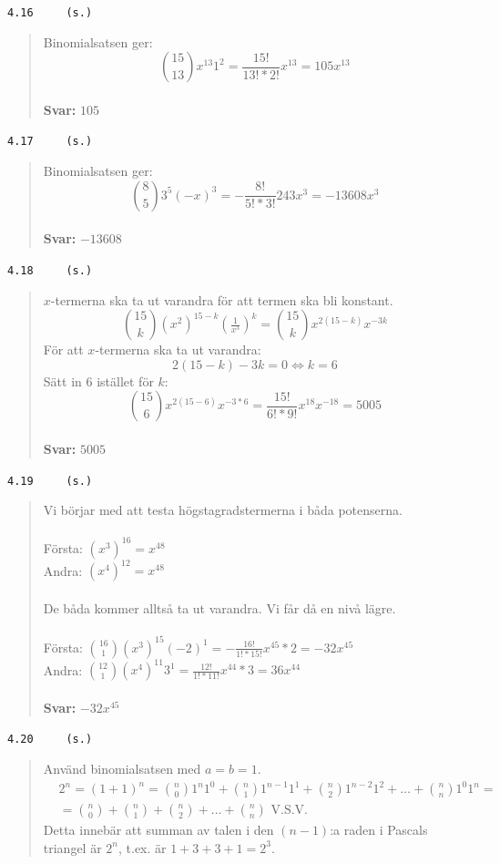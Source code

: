 \documentclass[a4paper]{article}
\newcommand{\tskcol}[1]{\textcolor{tskcol}{#1}}
\begin{document}
	\texttt{\tskcol{4.16~~~~ (s.)}}
	\begin{quotation}
		\noindent
		Binomialsatsen ger:
		\[{15 \choose 13}x^{13}1^2=
		\frac{15!}{13!*2!}x^{13}=
		105x^{13}\]
		\\
		\textbf{Svar:} $105$
	\end{quotation}
	
	\texttt{\tskcol{4.17~~~~ (s.)}}
	\begin{quotation}
		\noindent
		Binomialsatsen ger:
		\[{8 \choose 5}3^{5}(-x)^3=
		-\frac{8!}{5!*3!}243x^3=
		-13608x^3\]
		\\
		\textbf{Svar:} $-13608$
	\end{quotation}
	
	\pagebreak
	\texttt{\tskcol{4.18~~~~ (s.)}}
	\begin{quotation}
		\noindent
		$x$-termerna ska ta ut varandra för att termen ska bli konstant.
		\[{15 \choose k}(x^2)^{15-k}(\tfrac{1}{x^3})^k=
		{15 \choose k}x^{2(15-k)}x^{-3k}\]
		För att $x$-termerna ska ta ut varandra:
		\[2(15-k)-3k=0 \Leftrightarrow k=6\]
		Sätt in 6 istället för $k$:
		\[{15 \choose 6}x^{2(15-6)}x^{-3*6}=
		\frac{15!}{6!*9!}x^{18}x^{-18}=
		5005\]
		\\
		\textbf{Svar:} $5005$
	\end{quotation}
	
	\texttt{\tskcol{4.19~~~~ (s.)}}
	\begin{quotation}
		\noindent
		Vi börjar med att testa högstagradstermerna i båda potenserna.
		\\ \\
		Första: $(x^3)^{16}=x^{48}$
		\\
		Andra: $(x^4)^{12}=x^{48}$
		\\ \\
		De båda kommer alltså ta ut varandra. Vi får då en nivå lägre.
		\\ \\
		Första: ${16 \choose 1}(x^3)^{15}(-2)^1=-\frac{16!}{1!*15!}x^{45}*2=-32x^{45}$
		\\
		Andra: ${12 \choose 1}(x^4)^{11}3^1=\frac{12!}{1!*11!}x^{44}*3=36x^{44}$
		\\ \\
		\textbf{Svar:} $-32x^{45}$
	\end{quotation}
	
	\texttt{\tskcol{4.20~~~~ (s.)}}
	\begin{quotation}
		\noindent
		Använd binomialsatsen med $a=b=1$.
		\begin{align*}
		&2^n=
		(1+1)^n=
		{n \choose 0}1^n1^0+{n \choose 1}1^{n-1}1^1+{n \choose 2}1^{n-2}1^2+\ldots+{n \choose n}1^{0}1^{n}=\\
		&={n \choose 0}+{n \choose 1}+{n \choose 2}+\ldots+{n \choose n}\text{ V.S.V.}
		\end{align*}
		Detta innebär att summan av talen i den $(n-1)$:a raden i Pascals triangel är $2^n$, t.ex. är $1+3+3+1=2^3$.
	\end{quotation}
	
\end{document}
